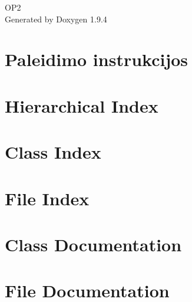 \documentclass[twoside]{book}
\newcommand{\+}{\discretionary{\mbox{\scriptsize$\hookleftarrow$}}{}{}}
\newcommand{\clearemptydoublepage}{%
    \newpage{\pagestyle{empty}\cleardoublepage}%
  }
\begin{document}
  \raggedbottom
    \hypersetup{pageanchor=false,
                bookmarksnumbered=true,
                pdfencoding=unicode
               }
  \begin{titlepage}
  \vspace*{7cm}
  \begin{center}%
  {\Large OP2}\\
  \vspace*{1cm}
  {\large Generated by Doxygen 1.9.4}\\
  \end{center}
  \end{titlepage}
  \clearemptydoublepage
  \tableofcontents
  \clearemptydoublepage
  \hypersetup{pageanchor=true}
\chapter{Paleidimo instrukcijos}
\label{md__home_xxmp_GitHub_OP2_README}

\chapter{Hierarchical Index}

\chapter{Class Index}

\chapter{File Index}

\chapter{Class Documentation}



\chapter{File Documentation}




  \backmatter
  \newpage
  \clearemptydoublepage
  \printindex
\end{document}
